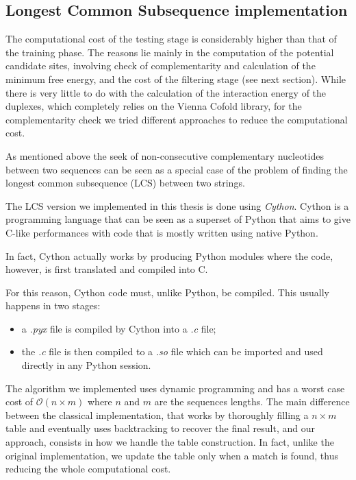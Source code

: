 \subsection{Longest Common Subsequence implementation}
The computational cost of the testing stage is considerably higher than that of the  training phase. The reasons lie mainly in the computation of the potential candidate sites, involving check of complementarity and calculation of the minimum free energy, and the cost of the filtering stage (see next section).    
While there is very little to do with the calculation of the interaction energy of the duplexes, which completely relies on the Vienna Cofold library, for the complementarity check we tried different approaches to reduce the computational cost.

As mentioned above the seek of non-consecutive complementary nucleotides between two sequences can be seen as a special case of the problem of finding the longest common subsequence (LCS) between two strings. 

The LCS version we implemented in this thesis is done using \emph{Cython}\cite{cython}. Cython is a programming language that can be seen as a superset of Python that aims to give C-like performances with code that is mostly written using native Python. 

In fact, Cython actually works by producing Python modules where the code, however, is first translated and compiled into C.

For this reason, Cython code must, unlike Python, be compiled. This usually happens in two stages: 

\begin{itemize}
	\item a \emph{.pyx} file is compiled by Cython into a \emph{.c} file;
	\item the \emph{.c} file is then compiled to a \emph{.so} file which can be imported and used directly in any Python session. 
\end{itemize}   

The algorithm we implemented uses dynamic programming and has a worst case cost of $\mathcal{O}(n \times m)$ where $n$ and $m$ are the sequences lengths. The main difference between the classical implementation, that works by thoroughly filling a $n \times m$ table and eventually uses  backtracking to recover the final result, and our approach, consists in how we handle the table construction. In fact, unlike the original implementation, we update the table only when a match is found, thus reducing the whole computational cost. 


